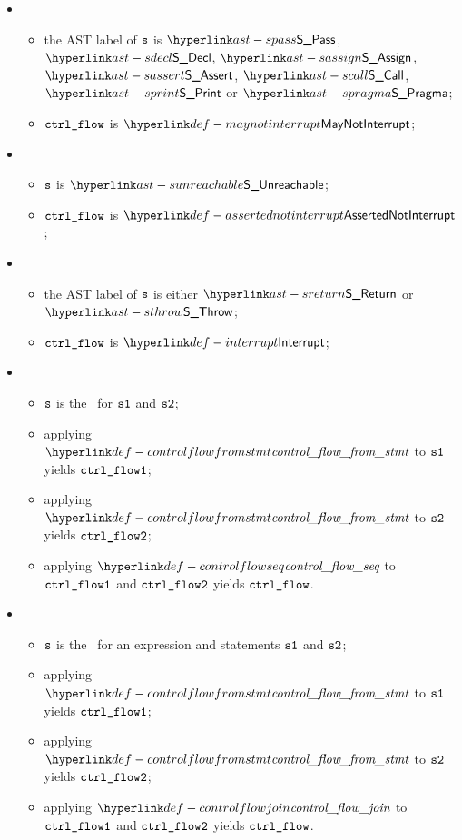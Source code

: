 \ProseParagraph
\OneApplies
\begin{itemize}
  \item {}
  \begin{itemize}
    \item the AST label of $\texttt{s}$ is $\SPass$, $\SDecl$, $\SAssign$, $\SAssert$, $\SCall$, $\SPrint$ or $\SPragma$;
    \item $\texttt{ctrl\_flow}$ is $\maynotinterrupt$;
  \end{itemize}

  \item {}
  \begin{itemize}
    \item $\texttt{s}$ is $\SUnreachable$;
    \item $\texttt{ctrl\_flow}$ is $\assertednotinterrupt$;
  \end{itemize}

  \item {}
  \begin{itemize}
    \item the AST label of $\texttt{s}$ is either $\SReturn$ or $\SThrow$;
    \item $\texttt{ctrl\_flow}$ is $\interrupt$;
  \end{itemize}

  \item {}
  \begin{itemize}
    \item $\texttt{s}$ is the \sequencingstatementterm\ for $\texttt{s1}$ and $\texttt{s2}$;
    \item applying $\controlflowfromstmt$ to $\texttt{s1}$ yields $\texttt{ctrl\_flow1}$;
    \item applying $\controlflowfromstmt$ to $\texttt{s2}$ yields $\texttt{ctrl\_flow2}$;
    \item applying $\controlflowseq$ to $\texttt{ctrl\_flow1}$ and $\texttt{ctrl\_flow2}$ yields $\texttt{ctrl\_flow}$.
  \end{itemize}

  \item {}
  \begin{itemize}
    \item $\texttt{s}$ is the \conditionalstatementterm\ for an expression and statements $\texttt{s1}$ and $\texttt{s2}$;
    \item applying $\controlflowfromstmt$ to $\texttt{s1}$ yields $\texttt{ctrl\_flow1}$;
    \item applying $\controlflowfromstmt$ to $\texttt{s2}$ yields $\texttt{ctrl\_flow2}$;
    \item applying $\controlflowjoin$ to $\texttt{ctrl\_flow1}$ and $\texttt{ctrl\_flow2}$ yields $\texttt{ctrl\_flow}$.
  \end{itemize}


\end{itemize}
